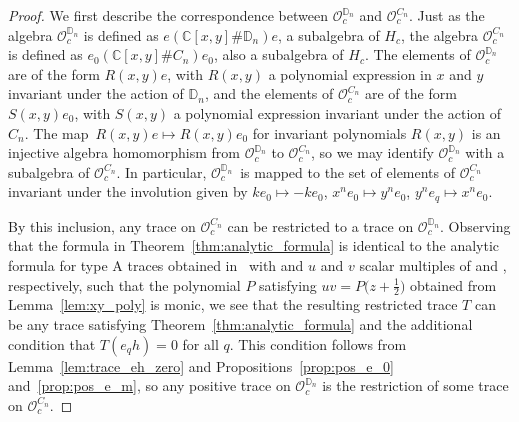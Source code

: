 \documentclass[pdftex]{sigma}
\newcommand\CC{\mathbb{C}}
\newcommand\DD{\mathbb{D}}
\newcommand\cO{\mathcal{O}}
\newcommand\half{\ensuremath{\frac{1}{2}}}
\numberwithin{equation}{section}
\theoremstyle{definition}
\begin{document}
\begin{proof}
 We first describe the correspondence between
 $\cO_c^{\DD_n}$ and $\cO_c^{C_n}$.
 Just as the algebra $\cO_c^{\DD_n}$
 is defined as $e (\CC[x, y] \# \DD_n) e$,
 a subalgebra of $H_c$,
 the algebra $\cO_c^{C_n}$
 is defined as $e_0 (\CC[x, y] \# C_n) e_0$,
 also a subalgebra of $H_c$.
 The elements of $\cO_c^{\DD_n}$
 are of the form $R(x, y) e$,
 with $R(x, y)$ a polynomial expression in $x$ and $y$
 invariant under the action of $\DD_n$,
 and the elements of $\cO_c^{C_n}$
 are of the form~$S(x, y) e_0$,
 with $S(x, y)$ a polynomial expression
 invariant under the action of $C_n$.
 The map~${R(x, y) e \mapsto R(x, y) e_0}$
 for invariant polynomials $R(x, y)$
 is an injective algebra homomorphism
 from $\cO_c^{\DD_n}$ to $\cO_c^{C_n}$,
 so we may identify $\cO_c^{\DD_n}$
 with a subalgebra of $\cO_c^{C_n}$.
 In particular,
 $\cO_c^{\DD_n}$~is mapped to the set of elements of $\cO_c^{C_n}$
 invariant under the involution given by
 $k e_0 \mapsto -k e_0$,
 $x^n e_0 \mapsto y^n e_0$,
 $y^n e_q \mapsto x^n e_0$.

 By this inclusion, any trace on $\cO_c^{C_n}$
 can be restricted to a trace on $\cO_c^{\DD_n}$.
 Observing that the formula in Theorem~\ref{thm:analytic_formula}
 is identical to the analytic formula for type A traces
 obtained in~\cite[Proposition~3.1]{etingof2021twisted}
 with 
 and $u$ and $v$ scalar multiples of
  and ,
 respectively,
 such that the polynomial $P$ satisfying $uv = P\bigl(z + \half\bigr)$
 obtained from Lemma~\ref{lem:xy_poly}
 is monic,
 we see that the resulting restricted trace $T$
 can be any trace satisfying Theorem~\ref{thm:analytic_formula}
 and the additional condition that $T(e_q h) = 0$
 for all $q$.
 This condition follows from
 Lemma~\ref{lem:trace_eh_zero} and Propositions~\ref{prop:pos_e_0} and~\ref{prop:pos_e_m},
 so any positive trace on $\cO_c^{\DD_n}$
 is the restriction of some trace on $\cO_c^{C_n}$.


\end{proof}
\end{document}
